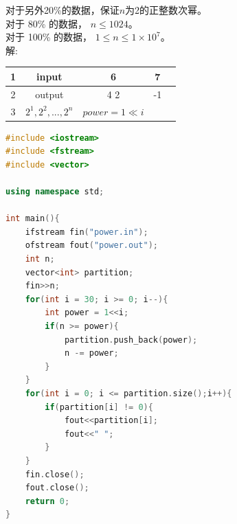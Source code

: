 \documentclass[12pt,twiside,a4paper]{ctexbook}
\numberwithin{chapter}{part}
\begin{document}
对于另外20\%的数据，保证$n$为2的正整数次幂。\\
对于 80\% 的数据， $n\leq 1024$。\\
对于 100\% 的数据， $1\leq n\leq 1\times10^7$。\\
解:\\
\begin{tabular}{|c|c|c|c|c|}
\hline
1 & input &6 & 7\\
\hline
2 & output & 4 2 & -1\\
\hline
3 & $2^1,2^2,...,2^n$ & $power = 1\ll i$& \\
\hline
\end{tabular}
\begin{lstlisting}[language=C++,breaklines=true]
#include <iostream>
#include <fstream>
#include <vector>

using namespace std;

int main(){
	ifstream fin("power.in");
	ofstream fout("power.out");
	int n;
	vector<int> partition;
	fin>>n;
	for(int i = 30; i >= 0; i--){
		int power = 1<<i;
		if(n >= power){
			partition.push_back(power);
			n -= power;
		}
	}
	for(int i = 0; i <= partition.size();i++){
		if(partition[i] != 0){
			fout<<partition[i];
			fout<<" ";
		}
	}
	fin.close();
	fout.close();
	return 0;
}
\end{lstlisting}
\end{document}
